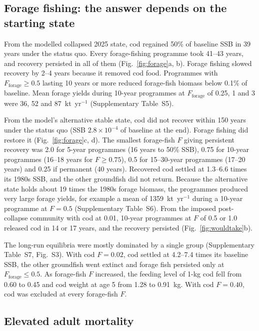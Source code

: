 \documentclass[12pt,letterpaper,fleqn]{article}
\begin{document}
\subsection{Forage fishing: the answer depends on the starting state}

From the modelled collapsed 2025 state, cod regained 50\% of baseline SSB in 39 years under the status quo. Every forage-fishing programme took 41--43 years, and recovery persisted in all of them (Fig.~\ref{fig:forage}a, b). Forage fishing slowed recovery by 2--4 years because it removed cod food. Programmes with $F_{\mathrm{forage}}\geq0.5$ lasting 10 years or more reduced forage-fish biomass below 0.1\% of baseline. Mean forage yields during 10-year programmes at $F_{\mathrm{forage}}$ of 0.25, 1 and 3 were 36, 52 and 87~kt~yr$^{-1}$ (Supplementary Table~S5).

From the model's alternative stable state, cod did not recover within 150 years under the status quo (SSB $2.8\times10^{-4}$ of baseline at the end). Forage fishing did restore it (Fig.~\ref{fig:forage}c, d). The smallest forage-fish $F$ giving persistent recovery was 2.0 for 5-year programmes (16 years to 50\% SSB), 0.75 for 10-year programmes (16--18 years for $F\geq0.75$), 0.5 for 15--30-year programmes (17--20 years) and 0.25 if permanent (40 years). Recovered cod settled at 1.3--6.6 times its 1980s SSB, and the other groundfish did not return. Because the alternative state holds about 19 times the 1980s forage biomass, the programmes produced very large forage yields, for example a mean of 1359~kt~yr$^{-1}$ during a 10-year programme at $F=0.5$ (Supplementary Table~S6). From the imposed post-collapse community with cod at 0.01, 10-year programmes at $F$ of 0.5 or 1.0 released cod in 14 or 17 years, and the recovery persisted (Fig.~\ref{fig:wouldtake}b).

The long-run equilibria were mostly dominated by a single group (Supplementary Table~S7, Fig.~S3). With cod $F=0.02$, cod settled at 4.2--7.4 times its baseline SSB, the other groundfish went extinct and forage fish persisted only at $F_{\mathrm{forage}}\leq0.5$. As forage-fish $F$ increased, the feeding level of 1-kg cod fell from 0.60 to 0.45 and cod weight at age 5 from 1.28 to 0.91~kg. With cod $F=0.40$, cod was excluded at every forage-fish $F$.

\subsection{Elevated adult mortality}
\end{document}
